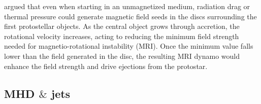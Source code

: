 \documentclass[11pt]{article}
\begin{document}
\cite{Silk2006}  argued that even when starting in an unmagnetized medium, radiation drag or thermal pressure could generate magnetic field seeds in the discs surrounding the first protostellar objects. As the central object grows through accretion, the rotational velocity increases, acting to reducing the minimum field strength needed for magnetio-rotational instability (MRI). Once the minimum value falls lower than the field generated in the disc, the resulting MRI dynamo would enhance the field strength and drive ejections from the protostar.







\subsection{MHD $\&$ jets}
\label{sub:MHD}
\end{document}
